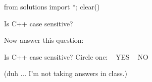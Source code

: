\begin{python0}
from solutions import *; clear()
\end{python0}

Is C++ case sensitive?



Now answer this question:

Is C++ case sensitive? Circle one: \,\,\, YES  \,\,\, NO

(duh ... I'm not taking answers in class.)


